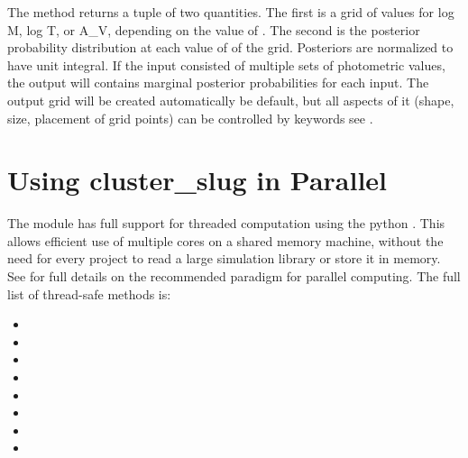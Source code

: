 \documentclass[letterpaper,10pt,english]{sphinxmanual}
\begin{document}
The  method returns a tuple of two quantities. The first is a grid of values for log M, log T, or A\_V, depending on the value of . The second is the posterior probability distribution at each value of of the grid. Posteriors are normalized to have unit integral. If the input consisted of multiple sets of photometric values, the output will contains marginal posterior probabilities for each input. The output grid will be created automatically be default, but all aspects of it (shape, size, placement of grid points) can be controlled by keywords \textendash{} see {\hyperref[\detokenize{cluster_slug:ssec-cluster-slug-full}]{}}.


\section{Using cluster\_slug in Parallel}
\label{\detokenize{cluster_slug:using-cluster-slug-in-parallel}}
The  module has full support for threaded computation using the python . This allows efficient use of multiple cores on a shared memory machine, without the need for every project to read a large simulation library or store it in memory. See {\hyperref[\detokenize{bayesphot:ssec-bayesphot-threading}]{}} for full details on the recommended paradigm for parallel computing. The full list of thread-safe  methods is:
\begin{itemize}
\item {} 

\item {} 

\item {} 

\item {} 

\item {} 

\item {} 

\item {} 

\item {} 

\end{itemize}
\end{document}
